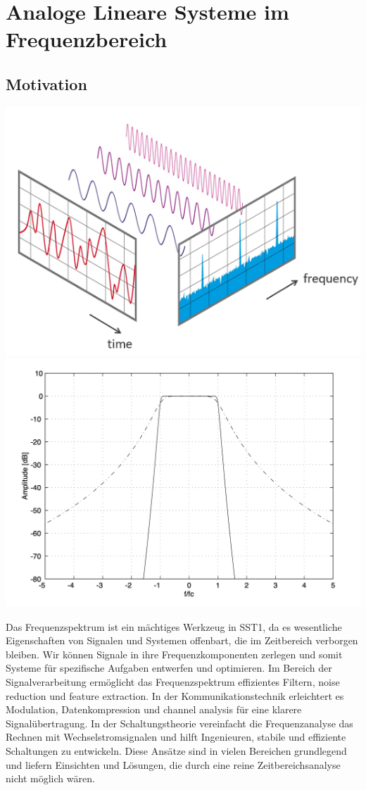 \documentclass[11pt]{article}
\begin{document}


\vfill \null
\pagebreak

\section*{Analoge Lineare Systeme im Frequenzbereich}
\vspace*{-0.5cm}
\subsection*{Motivation}
\vspace*{-0.75cm}
\begin{center}
    \includegraphics[width=0.35\linewidth]{docimgs/Zeit_und_Frequenzbereich.png}
    \includegraphics[width=0.3\linewidth]{docimgs/Butterworth_filter.png}
\end{center}
\vspace*{-0.5cm}
Das Frequenzspektrum ist ein mächtiges Werkzeug in SST1, da es wesentliche Eigenschaften von Signalen und Systemen offenbart, die im Zeitbereich verborgen bleiben. Wir können Signale in ihre Frequenzkomponenten zerlegen und somit Systeme für spezifische Aufgaben entwerfen und optimieren. Im Bereich der Signalverarbeitung ermöglicht das Frequenzspektrum effizientes Filtern, noise reduction und feature extraction. In der Kommunikationstechnik erleichtert es Modulation, Datenkompression und channel analysis für eine klarere Signalübertragung. In der Schaltungstheorie vereinfacht die Frequenzanalyse das Rechnen mit Wechselstromsignalen und hilft Ingenieuren, stabile und effiziente Schaltungen zu entwickeln. Diese Ansätze sind in vielen Bereichen grundlegend und liefern Einsichten und Lösungen, die durch eine reine Zeitbereichsanalyse nicht möglich wären.
\end{document}
